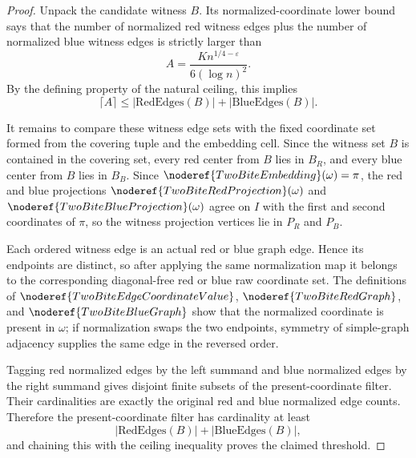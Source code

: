 \begin{proof}
Unpack the candidate witness \(B\).  Its normalized-coordinate lower bound
says that the number of normalized red witness edges plus the number of
normalized blue witness edges is strictly larger than
\[
A=\frac{K n^{1/4-\varepsilon}}{6(\log n)^2}.
\]
By the defining property of the natural ceiling, this implies
\[
\lceil A\rceil
\le |\mathrm{RedEdges}(B)|+|\mathrm{BlueEdges}(B)|.
\]

It remains to compare these witness edge sets with the fixed coordinate set
formed from the covering tuple and the embedding cell.  Since the witness
set \(B\) is contained in the covering set, every red center from \(B\) lies
in \(B_R\), and every blue center from \(B\) lies in \(B_B\).  Since
\(\noderef{TwoBiteEmbedding}(\omega)=\pi\), the red and blue projections
\(\noderef{TwoBiteRedProjection}(\omega)\) and
\(\noderef{TwoBiteBlueProjection}(\omega)\) agree on \(I\) with the first and
second coordinates of \(\pi\), so the witness projection vertices lie in
\(P_R\) and \(P_B\).

Each ordered witness edge is an actual red or blue graph edge.  Hence its
endpoints are distinct, so after applying the same normalization map it
belongs to the corresponding diagonal-free red or blue raw coordinate set.
The definitions of \(\noderef{TwoBiteEdgeCoordinateValue}\),
\(\noderef{TwoBiteRedGraph}\), and \(\noderef{TwoBiteBlueGraph}\) show that
the normalized coordinate is present in \(\omega\); if normalization swaps
the two endpoints, symmetry of simple-graph adjacency supplies the same
edge in the reversed order.

Tagging red normalized edges by the left summand and blue normalized edges by
the right summand gives disjoint finite subsets of the present-coordinate
filter.  Their cardinalities are exactly the original red and blue normalized
edge counts.  Therefore the present-coordinate filter has cardinality at
least
\[
|\mathrm{RedEdges}(B)|+|\mathrm{BlueEdges}(B)|,
\]
and chaining this with the ceiling inequality proves the claimed threshold.
\end{proof}
